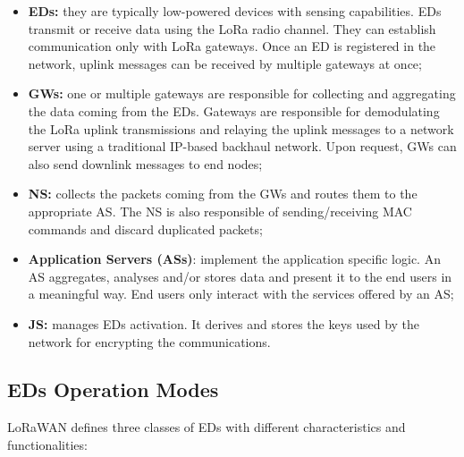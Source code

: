 \begin{itemize}
	\item \textbf{\glspl{ED}:} they are typically low-powered devices with sensing capabilities. \glspl{ED} transmit or receive data using the LoRa radio channel. They can establish communication only with LoRa gateways.
Once an \gls{ED} is registered in the network, uplink messages can be received by multiple gateways at once;

	\item \textbf{\glspl{GW}:} one or multiple gateways are responsible for collecting and aggregating the data coming from the \glspl{ED}. Gateways are responsible for demodulating the LoRa uplink transmissions and relaying the uplink messages to a network server using a traditional IP-based backhaul network. Upon request, \glspl{GW} can also send downlink messages to end nodes;
	
	\item \textbf{\gls{NS}:} collects the packets coming from the \glspl{GW} and routes them to the appropriate \gls{AS}. The \gls{NS} is also responsible of sending/receiving MAC commands and discard duplicated packets;
	
    \item \textbf{Application Servers (ASs)}: implement the application specific logic. An \gls{AS} aggregates, analyses and/or stores data and present it to the end users in a meaningful way. End users only interact with the services offered by an \gls{AS};
    
    \item \textbf{\gls{JS}:} manages \glspl{ED} activation. It derives and stores the keys used by the network for encrypting the communications.
        
\end{itemize}

\subsection{\glspl{ED} Operation Modes}

LoRaWAN defines three classes of \glspl{ED} with different characteristics and functionalities:

